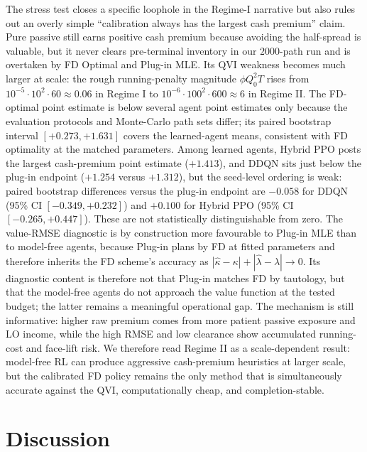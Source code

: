 \documentclass[]{interact}
\theoremstyle{plain}
\theoremstyle{definition}
\theoremstyle{remark}
\newcommand{\1}[1]{\mathbf{1}_{\{#1\}}}
\begin{document}
The stress test closes a specific loophole in the Regime-I narrative but also rules out an overly simple ``calibration always has the largest cash premium'' claim. Pure passive still earns positive cash premium because avoiding the half-spread is valuable, but it never clears pre-terminal inventory in our $2000$-path run and is overtaken by FD Optimal and Plug-in MLE. Its QVI weakness becomes much larger at scale: the rough running-penalty magnitude $\phi Q_0^2T$ rises from $10^{-5}\cdot10^2\cdot60\approx0.06$ in Regime I to $10^{-6}\cdot100^2\cdot600\approx6$ in Regime II. The FD-optimal point estimate is below several agent point estimates only because the evaluation protocols and Monte-Carlo path sets differ; its paired bootstrap interval $[+0.273,+1.631]$ covers the learned-agent means, consistent with FD optimality at the matched parameters. Among learned agents, Hybrid PPO posts the largest cash-premium point estimate ($+1.413$), and DDQN sits just below the plug-in endpoint ($+1.254$ versus $+1.312$), but the seed-level ordering is weak: paired bootstrap differences versus the plug-in endpoint are $-0.058$ for DDQN (95\% CI $[-0.349,+0.232]$) and $+0.100$ for Hybrid PPO (95\% CI $[-0.265,+0.447]$). These are not statistically distinguishable from zero. The value-RMSE diagnostic is by construction more favourable to Plug-in MLE than to model-free agents, because Plug-in plans by FD at fitted parameters and therefore inherits the FD scheme's accuracy as $|\hat\kappa-\kappa|+|\hat\lambda-\lambda|\to0$. Its diagnostic content is therefore not that Plug-in matches FD by tautology, but that the model-free agents do not approach the value function at the tested budget; the latter remains a meaningful operational gap. The mechanism is still informative: higher raw premium comes from more patient passive exposure and LO income, while the high RMSE and low clearance show accumulated running-cost and face-lift risk. We therefore read Regime II as a scale-dependent result: model-free RL can produce aggressive cash-premium heuristics at larger scale, but the calibrated FD policy remains the only method that is simultaneously accurate against the QVI, computationally cheap, and completion-stable.

\section{Discussion}\label{sec:discussion}
\end{document}
